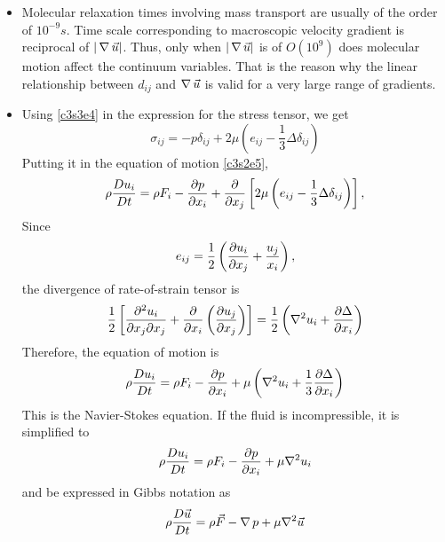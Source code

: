 \begin{itemize}
\item Molecular relaxation times involving mass transport are usually of the order of $10^{-9}s$\cite{bagchi2012molecular}. Time scale corresponding to macroscopic velocity gradient is 
reciprocal of $|\operatorname{\nabla}\vec{u}|$. Thus, only when $|\operatorname{\nabla}\vec{u}|$ is of $O(10^9)$ does molecular motion affect the continuum variables. That is the reason why the linear relationship 
between $d_{ij}$ and $\operatorname{\nabla}\vec{u}$ is valid for a very large range of gradients.

\item Using \eqref{c3s3e4} in the expression for the stress tensor, we get
\begin{equation}\label{c3s3e5}
\sigma_{ij} = -p\delta_{ij} + 2\mu\left(e_{ij} - \frac{1}{3}\Delta\delta_{ij}\right)
\end{equation}
Putting it in the equation of motion \eqref{c3s2e5},
\begin{equation}\label{c3s3e5a}
\rho\frac{D{u_i}}{Dt} = \rho F_i - \frac{\partial{p}}{\partial{x_i}} + \frac{\partial}{\partial x_j}\left[2\mu\left(e_{ij} - \frac{1}{3}\Delta\delta_{ij}\right)\right],
\end{equation}
Since
\[
e_{ij} = \frac{1}{2}\left(\frac{\partial{u_i}}{\partial{x_j}} + \frac{u_j}{x_i}\right),
\]
the divergence of rate-of-strain tensor is
\[
\frac{1}{2}\left[\frac{\partial^2 u_i}{\partial x_j \partial x_j} + \frac{\partial}{\partial x_i}\left(\frac{\partial{u_j}}{\partial{x_j}}\right)\right] = 
\frac{1}{2}\left(\nabla^2 u_i + \frac{\partial{\Delta}}{\partial{x_i}}\right)
\]
Therefore, the equation of motion is
\begin{equation}\label{c3s3e6}
\rho\frac{D{u_i}}{Dt} = \rho F_i - \frac{\partial{p}}{\partial{x_i}} + \mu\left(\nabla^2 u_i + \frac{1}{3}\frac{\partial{\Delta}}{\partial{x_i}}\right)
\end{equation}
This is the Navier-Stokes equation. If the fluid is incompressible, it is simplified to
\[
\rho\frac{D{u_i}}{Dt} = \rho F_i - \frac{\partial{p}}{\partial{x_i}} + \mu\nabla^2 u_i
\]
and be expressed in Gibbs notation as
\begin{equation}\label{c3s3e7}
\rho\frac{D{\vec{u}}}{Dt} = \rho\vec{F} - \operatorname{\nabla} p + \mu\nabla^2\vec{u}
\end{equation}


\end{itemize}
